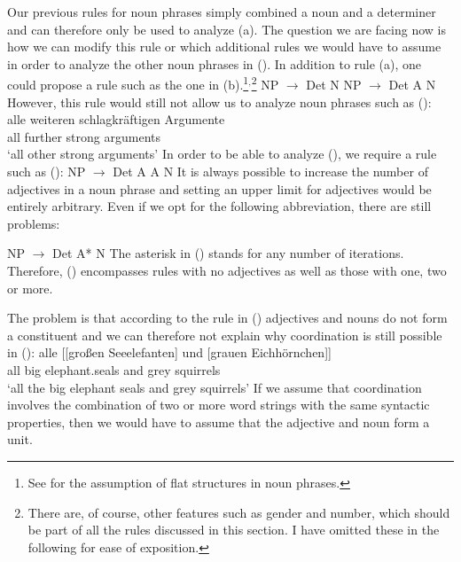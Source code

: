 Our previous rules for noun phrases simply combined a noun and a determiner and can therefore only be used to
analyze (a). The question we are facing now is how we can modify this rule or which additional rules we would
have to assume in order to analyze the other noun phrases in (). In addition to rule (a), one could propose 
a rule such as the one in (b).\footnote{%
	See  for the assumption of flat structures in noun phrases.
}$^,$\footnote{%
	There are, of course, other features such as gender and number, which should be part of all the rules
	discussed in this section. I have omitted these in the following for ease of exposition.
}
\eal
\ex NP $\to$ Det N
\ex NP $\to$ Det A N
\zl
However, this rule would still not allow us to analyze noun phrases such as ():
\ea
\label{Beispiel-alle-weitern-schlagkraeftigen-Argumente}
\gll alle weiteren schlagkräftigen Argumente\\
	 all further strong arguments\\
\glt `all other strong arguments'
\z
In order to be able to analyze (), we require a rule such as (): 
\ea 
NP $\to$ Det A A N
\z
It is always possible to increase the number of adjectives in a noun phrase and setting an upper limit for
adjectives would be entirely arbitrary. Even if we opt for the following abbreviation, there are still problems:

\ea 
NP $\to$ Det A* N
\z
The asterisk\is{*} in () stands for any number of iterations. Therefore, () encompasses rules with no adjectives
as well as those with one, two or more.

The problem is that according to the rule in () adjectives and nouns do not form a constituent and we can therefore not explain why coordination 
is still possible in ():
\ea
\gll alle [[großen Seeelefanten] und [grauen Eichhörnchen]]\\
     all  \spacebr{}\spacebr{}big elephant.seals and  \spacebr{}grey squirrels\\
\glt `all the big elephant seals and grey squirrels'	 
\z
If we assume that coordination involves the combination of two or more word strings with the same syntactic properties, then we would have to assume
that the adjective and noun form a unit.

